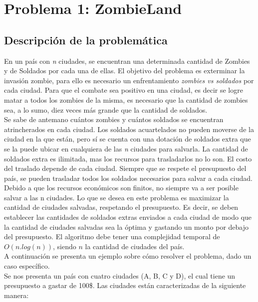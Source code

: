 \section{Problema 1: ZombieLand}

\subsection{Descripci\'on de la problem\'atica}

En un pa\'is con \emph{n} ciudades, se encuentran una determinada cantidad de Zombies y de Soldados por cada una de ellas. El objetivo del problema es exterminar la invasi\'on zombie, para ello es necesario un enfrentamiento \textit{zombies vs soldados} por cada ciudad. Para que el combate sea positivo en una ciudad, es decir se logre matar a todos los zombies de la misma, es necesario que la cantidad de zombies sea, a lo sumo, diez veces m\'as grande que la cantidad de soldados.\\

Se sabe de antemano cu\'antos zombies y cu\'antos soldados se encuentran atrincherados en cada ciudad. Los soldados acuartelados no pueden moverse de la ciudad en la que est\'an, pero s\'i se cuenta con una dotaci\'on de soldados extra que se la puede ubicar en cualquiera de las \emph{n} ciudades para salvarla. La cantidad de soldados extra es ilimitada, mas los recursos para trasladarlos no lo son. El costo del traslado depende de cada ciudad. Siempre que se respete el presupuesto del pa\'is, se pueden trasladar todos los soldados necesarios para salvar a cada ciudad.\\

Debido a que los recursos econ\'omicos son finitos, no siempre va a ser posible salvar a las n ciudades. Lo que se desea en este problema es maximizar la cantidad de ciudades salvadas, respetando el presupuesto. Es decir, se deben establecer las cantidades de soldados extras enviados a cada ciudad de modo que la cantidad de ciudades salvadas sea la \'optima y gastando un monto por debajo del presupuesto.  El algoritmo debe tener una complejidad temporal de $O(n.log(n))$, siendo $n$ la cantidad de ciudades del pa\'is.\\

A continuaci\'on se presenta un ejemplo sobre c\'omo resolver el problema, dado un caso espec\'ifico.\\

Se nos presenta un pa\'is con cuatro ciudades (A, B, C y D), el cual tiene un presupuesto a gastar de 100\$. Las ciudades est\'an caracterizadas de la siguiente manera:


